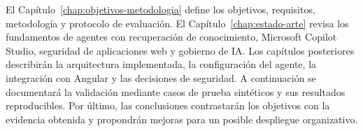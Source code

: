 El Capítulo~\ref{chap:objetivos-metodologia} define los objetivos, requisitos,
metodología y protocolo de evaluación. El Capítulo~\ref{chap:estado-arte}
revisa los fundamentos de agentes con recuperación de conocimiento, Microsoft
Copilot Studio, seguridad de aplicaciones web y gobierno de IA. Los capítulos
posteriores describirán la arquitectura implementada, la configuración del
agente, la integración con Angular y las decisiones de seguridad. A continuación
se documentará la validación mediante casos de prueba sintéticos y sus resultados
reproducibles. Por último, las conclusiones contrastarán los objetivos con la
evidencia obtenida y propondrán mejoras para un posible despliegue organizativo.

